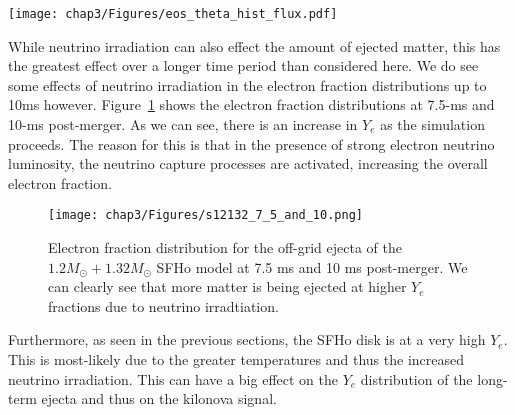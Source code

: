 \begin{figure*}[!htbp]
  \centering
  \texttt{[image: chap3/Figures/eos\_theta\_hist\_flux.pdf]}
\caption{
  Neutrino flux density moment as a function of angle for different EOS runs at 7.5ms. The angle is defined with respect to the equatorial plane with $0^\circ$ being the equator, and $\pm 90^\circ$ being the North and South poles. The different neutrino species are color coded.
}
\label{fig:theta_nu_eos}
\end{figure*}


While neutrino irradiation can also effect the amount of ejected matter, this has the greatest effect over a longer time period than considered here. We do see some effects of neutrino irradiation in the electron fraction distributions up to 10ms however. Figure~\ref{fig:s12132_75_and_10} shows the electron fraction distributions at 7.5-ms and 10-ms post-merger. As we can see, there is an increase in $Y_e$ as the simulation proceeds. The reason for this is that in the presence of strong electron neutrino luminosity, the neutrino capture processes are activated, increasing the overall electron fraction.

\begin{figure}[H]
  \centering
  \texttt{[image: chap3/Figures/s12132\_7\_5\_and\_10.png]}
\caption{
  Electron fraction distribution for the off-grid ejecta of the $1.2M_\odot + 1.32M_\odot$ SFHo model at 7.5 ms and 10 ms post-merger. We can clearly see that more matter is being ejected at higher $Y_e$ fractions due to neutrino irradtiation.
}
\label{fig:s12132_75_and_10}
\end{figure}
%
Furthermore, as seen in the previous sections, the SFHo disk is at a very high $Y_e$. This is most-likely due to the greater temperatures and thus the increased neutrino irradiation. This can have a big effect on the $Y_e$ distribution of the long-term ejecta and thus on the kilonova signal.



